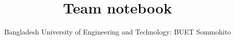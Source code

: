 \documentclass[10,a4paper,portrait,twosided]{extarticle}
\title{Team notebook}
\author{Bangladesh University of Engineering and Technology: BUET Sommohito}
\begin{document}
\renewcommand{\baselinestretch}{0.0}
\renewcommand{\baselinestretch}{.5}


\end{document}
